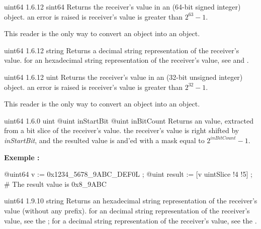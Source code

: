 {uint64}
{1.6.12}
{sint64}
{Returns the receiver's value in an  (64-bit signed integer) object.}
{an error is raised is receiver's value is greater than $2^{63}-1$.}

This reader is the only way to convert an  object into an  object.


{uint64}
{1.6.12}
{string}
{Returns a decimal string representation of the receiver's value.}
{for an hexadecimal string representation of the receiver's value, see  and .}



{uint64}
{1.6.12}
{uint}
{Returns the receiver's value in an  (32-bit unsigned integer) object.}
{an error is raised is receiver's value is greater than $2^{32}-1$.}

This reader is the only way to convert an  object into an  object.


{uint64}
{1.6.0}
{uint}
{@uint inStartBit}
{@uint inBitCount}
{Returns an  value, extracted from a bit slice of the receiver's value.}
{the receiver's value is right shifted by \emph{inStartBit}, and the resulted value is and'ed with a mask equal to $2^{inBitCount}-1$.}


\textbf{Exemple :}
\begin{galgascode}
@uint64 v := 0x1234_5678_9ABC_DEF0L ;
@uint result := [v uintSlice !4 !5] ; # The result value is 0x8_9ABC
\end{galgascode}





{uint64}
{1.9.10}
{string}
{Returns an hexadecimal string representation of the receiver's value (without any prefix).}
{for an decimal string representation of the receiver's value, see the ; for a decimal string representation of the receiver's value, see the .}






